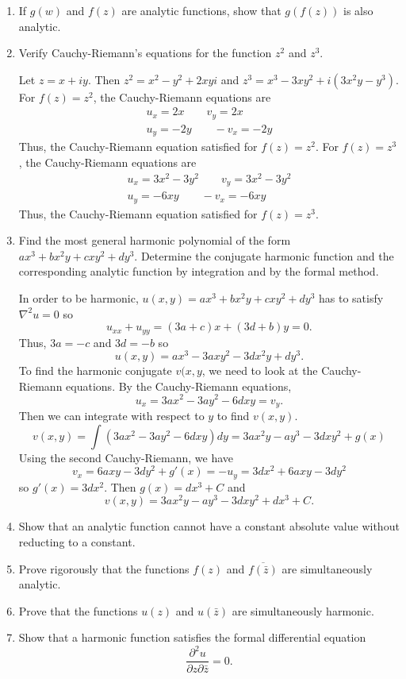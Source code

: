 \begin{enumerate}
\item
  If \(g(w)\) and \(f(z)\) are analytic functions, show that \(g(f(z))\) is
  also analytic.
  
\item
  Verify Cauchy-Riemann's equations for the function \(z^2\) and \(z^3\).
  \par\smallskip
  Let \(z = x + iy\).
  Then \(z^2 = x^2 - y^2 + 2xyi\) and
  \(z^3 = x^3 - 3xy^2 + i(3x^2y - y^3)\).
  For \(f(z) = z^2\), the Cauchy-Riemann equations are
  \begin{gather*}
    u_x = 2x \qquad v_y = 2x\\
    u_y = -2y \qquad -v_x = -2y
  \end{gather*}
  Thus, the Cauchy-Riemann equation satisfied for \(f(z) = z^2\).
  For \(f(z) = z^3\), the Cauchy-Riemann equations are
  \begin{gather*}
    u_x = 3x^2 - 3y^2 \qquad v_y = 3x^2 - 3y^2\\
    u_y = -6xy \qquad -v_x = -6xy
  \end{gather*}
  Thus, the Cauchy-Riemann equation satisfied for \(f(z) = z^3\).
\item
  Find the most general harmonic polynomial of the form
  \(ax^3 + bx^2y + cxy^2 + dy^3\).
  Determine the conjugate harmonic function and the corresponding analytic
  function by integration and by the formal method.
  \par\smallskip
  In order to be harmonic, \(u(x,y) = ax^3 + bx^2y + cxy^2 + dy^3\) has to
  satisfy \(\nabla^2u = 0\) so
  \[
  u_{xx} + u_{yy} = (3a + c)x + (3d + b)y = 0.
  \]
  Thus, \(3a = -c\) and \(3d = -b\) so
  \[
  u(x,y) = ax^3 - 3axy^2 - 3dx^2y + dy^3.
  \]
  To find the harmonic conjugate \(v(x,y\), we need to look at the
  Cauchy-Riemann equations.
  By the Cauchy-Riemann equations,
  \[
  u_x = 3ax^2 - 3ay^2 - 6dxy = v_y.
  \]
  Then we can integrate with respect to \(y\) to find \(v(x,y)\).
  \[
  v(x,y) = \int(3ax^2 - 3ay^2 - 6dxy)dy = 3ax^2y - ay^3 - 3dxy^2 + g(x)
  \]
  Using the second Cauchy-Riemann, we have
  \[
  v_x = 6axy - 3dy^2 + g'(x) = -u_y = 3dx^2 + 6axy - 3dy^2
  \]
  so \(g'(x) = 3dx^2\).
  Then \(g(x) = dx^3 + C\) and
  \[
  v(x,y) = 3ax^2y - ay^3 - 3dxy^2 + dx^3 + C.
  \]
\item
  Show that an analytic function cannot have a constant absolute value without
  reducting to a constant.
\item
  Prove rigorously that the functions \(f(z)\) and \(\overline{f(\bar{z})}\)
  are simultaneously analytic.
\item
  Prove that the functions \(u(z)\) and \(u(\bar{z})\) are simultaneously
  harmonic.
\item
  Show that a harmonic function satisfies the formal differential equation
  \[
  \frac{\partial^2u}{\partial z\partial\bar{z}} = 0.
  \]
\end{enumerate}
